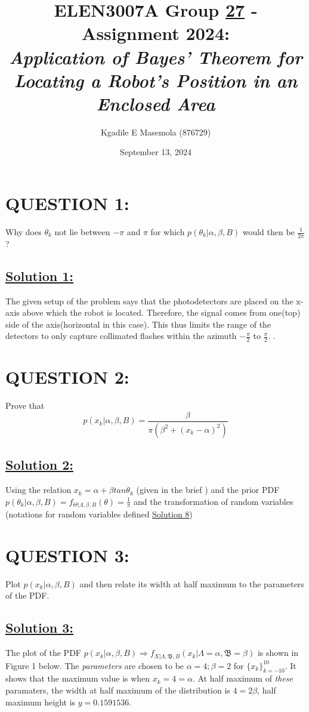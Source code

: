 \documentclass[a4paper,11pt]{article}
\title{ELEN3007A Group \underline{27} - Assignment 2024: \\ 
\large \emph{Application of Bayes’ Theorem for Locating a Robot’s
Position in an Enclosed Area}}
\author{Kgadile E Masemola (876729)}
\date{September 13, 2024}
\begin{document}
\maketitle

\section{QUESTION 1:}  Why does $\theta_k$ not lie between $- \pi$ and $\pi$ for which $p(\theta_k | \alpha, \beta, B)$ would then be $\frac{1}{2\pi}$?

\subsection*{\underline{Solution 1:}}
The given setup of the problem says that the photodetectors are placed on the x-axis above which the robot is located. Therefore, the signal comes from one(top) side of the axis(horizontal in this case). This thus limits the range of the detectors to only capture collimated flashes within the azimuth $-\frac{\pi}{2}$ to $\frac{\pi}{2}$. . 

\section{QUESTION 2:}
Prove that
\begin{equation}
	p(x_k | \alpha, \beta, B) = \frac{\beta}{\pi (\beta^2 + (x_k - \alpha)^2)}
\end{equation}
\subsection*{\underline{Solution 2:}}
\label{sec:proof}
Using the relation $x_k = \alpha + \beta tan \theta_k$ (given in the brief \cite{vanWyk2024}) and the prior PDF $p(\theta_k | \alpha, \beta, B) = f_{\Theta | \Lambda, \beta, B}(\theta) = \frac{1}{\pi}$ and the transformation of random variables (notations for random variables defined \hyperref[sec:notation]{Solution 8})

\section{QUESTION 3:}
Plot $p(x_k | \alpha, \beta, B)$ and then relate its width at half maximum to the parameters of the PDF.

\subsection*{\underline{Solution 3:}}
The plot of the PDF $ p(x_k | \alpha, \beta, B) \Rightarrow f_{X | \Lambda, \mathfrak{B}, B}(x_k |\Lambda = \alpha, \mathfrak{B} = \beta)$ is shown in Figure 1 below. The \emph{parameters} are chosen to be $\alpha = 4; \beta = 2$ for $\{x_k \}^ {10} _{k = -10}$. It shows that the maximum value is when $x_k = 4 = \alpha$. At half maximum of \emph{these} paramaters, the width at half maximum of the distribution is $4 = 2 \beta$, half maximum height is $y = 0.1591536$.
\end{document}
